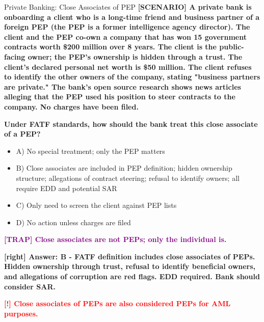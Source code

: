 \documentclass[11pt,a4paper]{beamer}
\newcommand{\redflag}[1]{\textcolor{red}{\textbf{[!] #1}}}
\newcommand{\trap}[1]{\textcolor{purple}{\textbf{[TRAP] #1}}}
\newcommand{\correct}[1]{\textcolor{green!50!black}{\textbf{[right] #1}}}
\newcommand{\scenario}[1]{\textcolor{blue!70!black}{\textbf{[SCENARIO] #1}}}
\begin{document}
	
	\begin{frame}{Private Banking: Close Associates of PEP}
		\tiny
		\scenario{A private bank is onboarding a client who is a long-time friend and business partner of a foreign PEP (the PEP is a former intelligence agency director). The client and the PEP co-own a company that has won 15 government contracts worth \$200 million over 8 years. The client is the public-facing owner; the PEP's ownership is hidden through a trust. The client's declared personal net worth is \$50 million. The client refuses to identify the other owners of the company, stating "business partners are private." The bank's open source research shows news articles alleging that the PEP used his position to steer contracts to the company. No charges have been filed.}
		
		\vspace{0.02cm}
		\textbf{Under FATF standards, how should the bank treat this close associate of a PEP?}
		\vspace{0.02cm}
		
		\begin{itemize}
			\item A) No special treatment; only the PEP matters
			\item B) Close associates are included in PEP definition; hidden ownership structure; allegations of contract steering; refusal to identify owners; all require EDD and potential SAR
			\item C) Only need to screen the client against PEP lists
			\item D) No action unless charges are filed
		\end{itemize}
		
		\vspace{0.02cm}
		\trap{Close associates are not PEPs; only the individual is.}
		
		\vspace{0.02cm}
		\correct{Answer: B - FATF definition includes close associates of PEPs. Hidden ownership through trust, refusal to identify beneficial owners, and allegations of corruption are red flags. EDD required. Bank should consider SAR.}
		
		\vspace{0.02cm}
		\redflag{Close associates of PEPs are also considered PEPs for AML purposes.}
	\end{frame}
	
\end{document}
